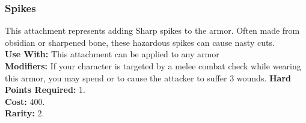 \subsubsection{Spikes}
This attachment represents adding Sharp spikes to the armor.
Often made from obsidian or sharpened bone, these hazardous
spikes can cause nasty cuts.\\
\textbf{Use With:} This attachment can be applied to any armor\\
\textbf{Modifiers:} If your character is targeted by a melee
    combat check while wearing this armor, you may spend
    \threat\threat\threat or \despair to cause the attacker to suffer 3 wounds.
\textbf{Hard Points Required:} 1.\\
\textbf{Cost:} 400.\\
\textbf{Rarity:} 2.\\
